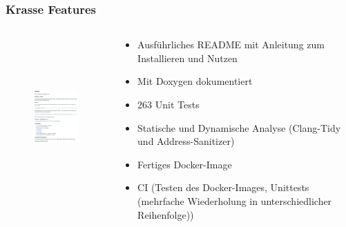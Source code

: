 \documentclass[aspectratio=169]{beamer}
\begin{document}
\begin{frame}
    \frametitle{Krasse Features}
    \begin{columns}
        \begin{column}{0.4\textwidth}
            \begin{center}
                \begin{figure}[H]
                    \includegraphics[height=6cm]{doku.png}
                \end{figure}
            \end{center}
        \end{column}
        \begin{column}{0.6\textwidth}
            \begin{itemize}
                \item Ausführliches README mit Anleitung zum Installieren und Nutzen
                    \pause
                \item Mit Doxygen dokumentiert
                    \pause
                \item 263 Unit Tests %
                    \pause
                \item Statische und Dynamische Analyse (Clang-Tidy und Address-Sanitizer)
                    \pause
                \item Fertiges Docker-Image
                    \pause
                \item CI (Testen des Docker-Images, Unittests (mehrfache Wiederholung in unterschiedlicher Reihenfolge))
            \end{itemize}
        \end{column}
    \end{columns}
\end{frame}
\end{document}
